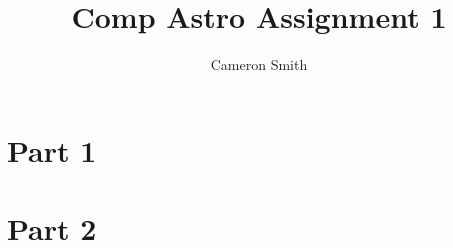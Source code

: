 \documentclass{article}
\title{Comp Astro Assignment 1}
\author{Cameron Smith }
\begin{document}
\maketitle

\section*{Part 1}



\section*{Part 2}
\end{document}
